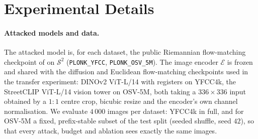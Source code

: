 \section{Experimental Details}
\label{app:exp_details}

\paragraph{Attacked models and data.}
The attacked model is, for each dataset, the public Riemannian flow-matching checkpoint of
\citet{dufour2024around} on $\mathcal{S}^2$ (\texttt{PLONK\_YFCC}, \texttt{PLONK\_OSV\_5M}).
The image encoder $\mathcal{E}$ is frozen and shared with the diffusion and Euclidean
flow-matching checkpoints used in the transfer experiment: DINOv2 ViT-L/14 with registers
\citep{oquab2024dinov2} on YFCC4k, the StreetCLIP ViT-L/14 vision tower
\citep{haas2023streetclip} on OSV-5M, both taking a $336{\times}336$ input obtained by a
$1{:}1$ centre crop, bicubic resize and the encoder's own channel normalisation. We evaluate
$4\,000$ images per dataset: YFCC4k in full, and for OSV-5M a fixed, prefix-stable subset of
the test split (seeded shuffle, seed $42$), so that every attack, budget and ablation sees
exactly the same images.

